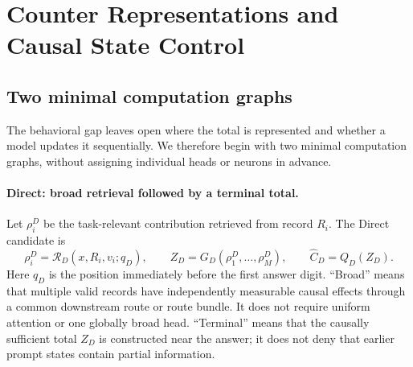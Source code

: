 \section{Counter Representations and Causal State Control}
\label{sec:representations}

\subsection{Two minimal computation graphs}

The behavioral gap leaves open where the total is represented and whether a model updates it sequentially. We therefore begin with two minimal computation graphs, without assigning individual heads or neurons in advance.

\paragraph{Direct: broad retrieval followed by a terminal total.}
Let \(\rho_i^D\) be the task-relevant contribution retrieved from record \(R_i\). The Direct candidate is
\begin{equation}
\rho_i^D=\mathcal R_D(x,R_i,v_i;q_D),
\qquad
Z_D=G_D(\rho_1^D,\ldots,\rho_M^D),
\qquad
\widehat C_D=Q_D(Z_D).
\label{eq:direct-mechanism}
\end{equation}
Here \(q_D\) is the position immediately before the first answer digit. ``Broad'' means that multiple valid records have independently measurable causal effects through a common downstream route or route bundle. It does not require uniform attention or one globally broad head. ``Terminal'' means that the causally sufficient total \(Z_D\) is constructed near the answer; it does not deny that earlier prompt states contain partial information.

